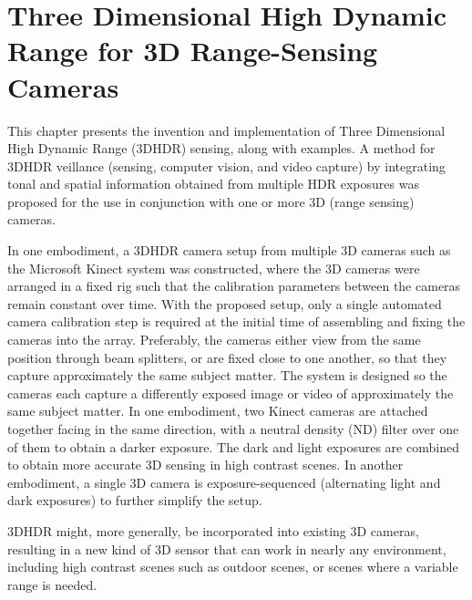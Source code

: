 \chapter{Three Dimensional High Dynamic Range for 3D Range-Sensing Cameras}
\label{3dhdr3dsensing}

This chapter presents the invention and implementation of Three Dimensional High Dynamic Range 
(3DHDR) sensing, along with examples. A method for 3DHDR veillance (sensing, computer vision, 
and video capture) by integrating tonal and spatial information obtained from multiple HDR exposures 
was proposed for the use in conjunction with one or more 3D (range sensing) cameras.

In one embodiment, a 3DHDR camera setup from multiple 3D cameras such as the Microsoft Kinect 
system was constructed, where the 3D cameras were arranged in a fixed rig such that the calibration 
parameters between the cameras remain constant over time. With the proposed setup, only a single 
automated camera calibration step is required at the initial time of assembling and fixing the cameras 
into the array.  Preferably, the cameras either view from the same position through beam splitters, or 
are fixed close to one another, so that they capture approximately the same subject matter. The 
system is designed so the cameras each capture a differently exposed image or video of 
approximately the same subject matter.  In one embodiment, two Kinect cameras are attached 
together facing in the same direction, with a neutral density (ND) filter over one of them to obtain a 
darker exposure.  The dark and light exposures are combined to obtain more accurate 3D sensing in 
high contrast scenes.  In another embodiment, a single 3D camera is exposure-sequenced 
(alternating light and dark exposures) to further simplify the setup.

3DHDR might, more generally, be incorporated into existing 3D cameras, resulting in a new kind of 3D 
sensor that can work in nearly any environment, including high contrast scenes such as outdoor 
scenes, or scenes where a variable range is needed.

